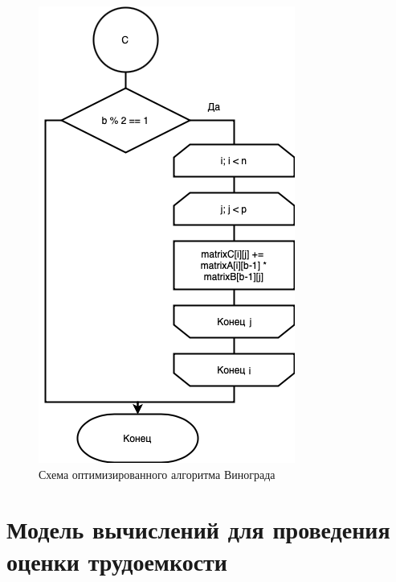 \begin{figure}[h]
    \centering
    \includegraphics[width=0.5\linewidth]{img/WinogradOptD.png}
    \caption{Схема оптимизированного алгоритма Винограда}
    \label{fig:mpr5}
\end{figure}

\clearpage

\section{Модель вычислений для проведения оценки трудоемкости}

